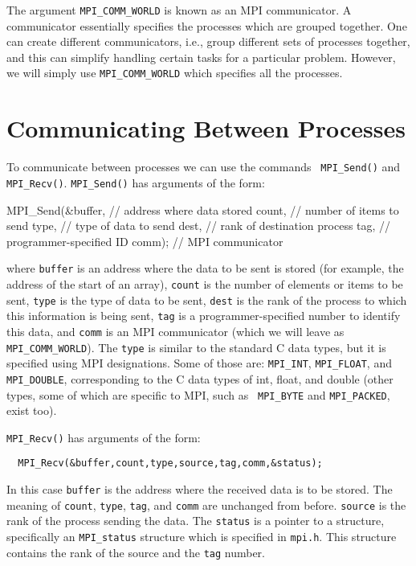The argument {\tt MPI\_COMM\_WORLD} is known as an MPI communicator.
A communicator essentially specifies the processes which are grouped
together.  One can create different communicators, i.e., group
different sets of processes together, and this can simplify handling
certain tasks for a particular problem.  However, we will simply use
{\tt MPI\_COMM\_WORLD} which specifies all the processes.

\section{Communicating Between Processes}

To communicate between processes we can use the commands {\tt
MPI\_Send()} and {\tt MPI\_Recv()}.  {\tt MPI\_Send()} has arguments of
the form:
\begin{code}
  MPI_Send(&buffer, // address where data stored
           count,   // number of items to send
           type,    // type of data to send
           dest,    // rank of destination process
           tag,     // programmer-specified ID
           comm);   // MPI communicator
\end{code}
where {\tt buffer} is an address where the data to be sent is stored
(for example, the address of the start of an array), {\tt count} is
the number of elements or items to be sent, {\tt type} is the type of
data to be sent, {\tt dest} is the rank of the process to which this
information is being sent, {\tt tag} is a programmer-specified number
to identify this data, and {\tt comm} is an MPI communicator (which we
will leave as {\tt MPI\_COMM\_WORLD}).  The {\tt type} is similar to
the standard C data types, but it is specified using MPI designations.
Some of those are: {\tt MPI\_INT}, {\tt MPI\_FLOAT}, and {\tt
MPI\_DOUBLE}, corresponding to the C data types of int, float, and
double (other types, some of which are specific to MPI, such as {\tt
MPI\_BYTE} and {\tt MPI\_PACKED}, exist too).

{\tt MPI\_Recv()} has arguments of the form:
\begin{verbatim}
  MPI_Recv(&buffer,count,type,source,tag,comm,&status);
\end{verbatim}
In this case {\tt buffer} is the address where the received data is to
be stored.  The meaning of {\tt count}, {\tt type}, {\tt tag}, and
{\tt comm} are unchanged from before.  {\tt source} is the rank of the
process sending the data.  The {\tt status} is a pointer to a
structure, specifically an {\tt MPI\_status} structure which is
specified in {\tt mpi.h}.  This structure contains the rank of the
source and the {\tt tag} number.

